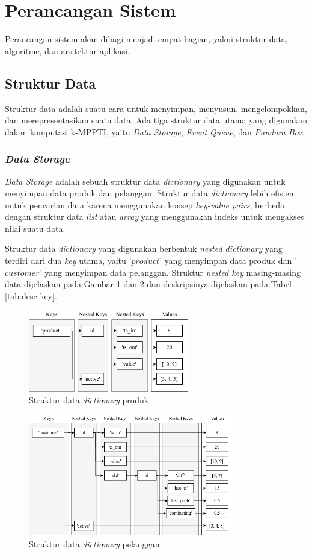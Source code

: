 \section{Perancangan Sistem}
\tab Perancangan sistem akan dibagi menjadi empat bagian, yakni struktur data, algoritme, dan arsitektur aplikasi. 

\subsection{Struktur Data}
\tab Struktur data adalah suatu cara untuk menyimpan, menyusun, mengelompokkan, dan merepresentasikan suatu data. Ada tiga struktur data utama yang digunakan dalam komputasi k-MPPTI, yaitu \textit{Data Storage}, \textit{Event Queue}, dan \textit{Pandora Box}.

\subsubsection{\textit{Data Storage}}
\tab \textit{Data Storage} adalah sebuah struktur data \textit{dictionary} yang digunakan untuk menyimpan data produk dan pelanggan. Struktur data \textit{dictionary} lebih efisien untuk pencarian data karena menggunakan konsep \textit{key-value pairs}, berbeda dengan struktur data \textit{list} atau \textit{array} yang menggunakan indeks untuk mengakses nilai suatu data.

Struktur data \textit{dictionary} yang digunakan berbentuk \textit{nested dictionary} yang terdiri dari dua \textit{key} utama, yaitu '$product$' yang menyimpan data produk dan '$customer$' yang menyimpan data pelanggan. Struktur \textit{nested key} masing-masing data dijelaskan pada Gambar \ref{fig:sd1} dan \ref{fig:sd2} dan deskripsinya dijelaskan pada Tabel \ref{tab:desc-key}.

\begin{figure}[H]
	\centering
	\includegraphics[width=7cm]{assets/img/bab3/sd1.png}
	\caption{Struktur data \textit{dictionary} produk}
	\label{fig:sd1}
\end{figure}

\begin{figure}[H]
	\centering
	\includegraphics[width=9cm]{assets/img/bab3/sd2.png}
	\caption{Struktur data \textit{dictionary} pelanggan}
	\label{fig:sd2}
\end{figure}


